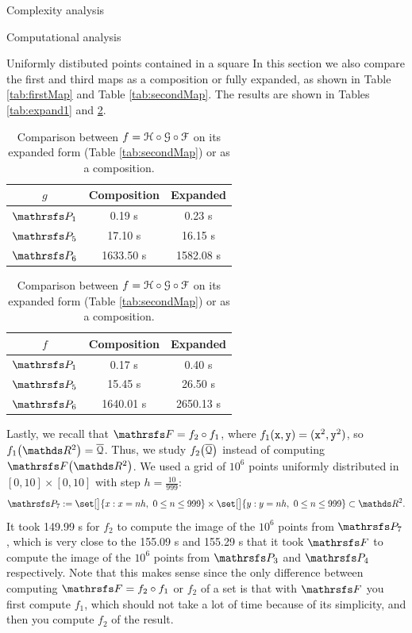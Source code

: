 \documentclass[11pt, a4paper, english, twoside, notitlepage, openright]{report}
\begin{document}
\begin{chapter}{Complexity analysis}
\begin{section}{Computational analysis}
\begin{subsection}{Uniformly distibuted points contained in a square}
In this section we also compare the first and third maps as a composition or fully expanded, as shown in Table \ref{tab:firstMap} and Table \ref{tab:secondMap}. The results are shown in Tables \ref{tab:expand1} and \ref{tab:expand2}.

\begin{table}[ht!]
\parbox{.45\linewidth}{
\centering
\begin{tabular}{c || c | c }
$g$ & Composition &Expanded \\ \hline \hline
$\PP_1$ & 0.19 s & 0.23 s \\ \hline
$\PP_5$ & 17.10 s & 16.15 s \\ \hline
$\PP_6$ & 1633.50 s & 1582.08 s \\
\end{tabular}
\caption[Comparison between $g$ on its expanded form or as a composition.]{Comparison between $g= \P\circ Q \circ H$ on its expanded form (Table \ref{tab:firstMap}) or as a composition.}\label{tab:expand1}
}
\hfill
\parbox{.45\linewidth}{
\centering
\begin{tabular}{c || c | c }
$f$ & Composition &Expanded \\ \hline \hline
$\PP_1$ & 0.17 s & 0.40 s \\ \hline
$\PP_5$ & 15.45 s & 26.50 s \\ \hline
$\PP_6$ & 1640.01 s & 2650.13 s \\
\end{tabular}
\caption[Comparison between $f$ on its expanded form or as a composition.]{Comparison between $f=\mathcal{H}\circ\mathcal{G}\circ\mathcal{F}$ on its expanded form (Table \ref{tab:secondMap}) or as a composition.}\label{tab:expand2}
}
\end{table}

Lastly, we recall that $\FFF = f_2\circ f_1$, where $f_1({\tt x}, {\tt y}) = ({\tt x}^2, {\tt y}^2)$, so $f_1\big(\R^2\big) = \overline{\Qu}$. Thus, we study $f_2\big(\overline{\mathcal{Q}}\big)$ instead of computing $\FFF\big(\R^2\big)$. We used a grid of $10^6$ points uniformly distributed in $[0, 10]\times[0,10]$ with step $h=\tfrac{10}{999}$:
$$
\PP_7 := \set[\big]{x: x = nh,\ 0\le n\le 999 } \times \set[\big]{y: y=nh,\ 0\le n\le 999 } \subset \R^2.
$$
It took 149.99 s for $f_2$ to compute the image of the $10^6$ points from $\PP_7$, which is very close to the 155.09 s and 155.29 s that it took $\FFF$ to compute the image of the $10^6$ points from $\PP_3$ and $\PP_4$ respectively. Note that this makes sense since the only difference between computing $\FFF= f_2\circ f_1$ or $f_2$ of a set is that with $\FFF$ you first compute $f_1$, which should not take a lot of time because of its simplicity, and then you compute $f_2$ of the result.
\end{subsection}


\end{section}
\end{chapter}
\end{document}
